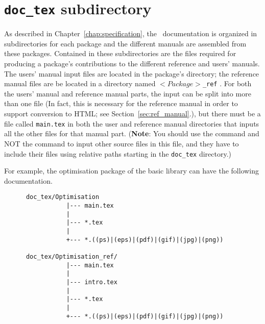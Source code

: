 \section{{\tt doc\_tex} subdirectory}
\label{sec:doc_tex_subdirectory}

As described in Chapter~\ref{chap:specification}, the \cgal\ documentation is
organized in subdirectories for each package and the different manuals
are assembled from these packages. Contained in these
subdirectories are the files required for producing a package's contributions
to the different reference and users' manuals. The users' manual input
files are located in the package's directory; the reference manual files are
be located in a directory named $<Package>${\tt \_ref}
.  
For both the users' manual and reference manual parts, the input can be
split into more than one file (In fact, this is necessary for the reference
manual in order to support conversion to HTML; 
see Section~\ref{sec:ref_manual}.), but there must be a file called 
{\tt main.tex} in both the user and reference manual directories that inputs 
all the other files for that manual part.
({\bf Note}: You should use the \verb|| command and NOT the 
\verb|| command to input other source files in this file, and
they have to include their files using relative paths starting in the
\texttt{doc\_tex} directory.)  

For example, the optimisation package of 
the basic library can have the following documentation. 
\begin{verbatim}
      doc_tex/Optimisation
                 |--- main.tex
                 |
                 |--- *.tex
                 |
                 +--- *.((ps)|(eps)|(pdf)|(gif)|(jpg)|(png))

      doc_tex/Optimisation_ref/
                 |--- main.tex
                 |
                 |--- intro.tex
                 |
                 |--- *.tex
                 |
                 +--- *.((ps)|(eps)|(pdf)|(gif)|(jpg)|(png))

\end{verbatim}


